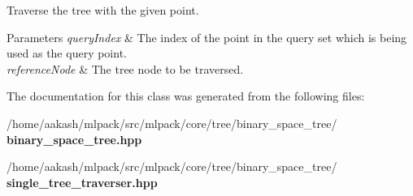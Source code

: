 Traverse the tree with the given point. 


\begin{DoxyParams}{Parameters}
{\em query\+Index} & The index of the point in the query set which is being used as the query point. \\
\hline
{\em reference\+Node} & The tree node to be traversed. \\
\hline
\end{DoxyParams}


The documentation for this class was generated from the following files\+:\begin{DoxyCompactItemize}
\item 
/home/aakash/mlpack/src/mlpack/core/tree/binary\+\_\+space\+\_\+tree/\textbf{ binary\+\_\+space\+\_\+tree.\+hpp}\item 
/home/aakash/mlpack/src/mlpack/core/tree/binary\+\_\+space\+\_\+tree/\textbf{ single\+\_\+tree\+\_\+traverser.\+hpp}\end{DoxyCompactItemize}
